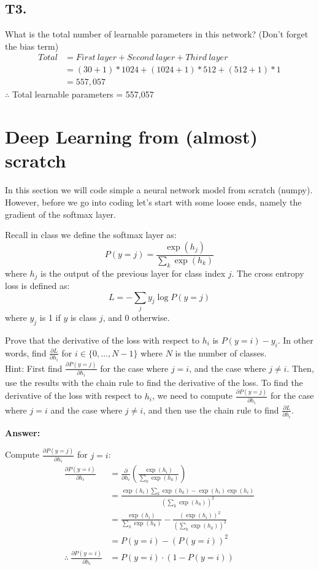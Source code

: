 \documentclass[12pt]{article}
\begin{document}
\subsection*{T3.}
\quad What is the total number of learnable parameters in this network? (Don’t forget the bias term)
\[
    \begin{split}
        Total
        &= First\ layer + Second\ layer + Third\ layer \\
        &= (30+1)*1024 + (1024+1)*512 + (512+1)*1 \\
        &= 557,057
    \end{split}
\]
$\therefore$ Total learnable parameters = 557,057

\section*{Deep Learning from (almost) scratch}
\quad In this section we will code simple a neural network model from scratch (numpy). However, before we go into coding let’s start with some loose ends, namely the gradient of the softmax layer.

Recall in class we define the softmax layer as:
\[
    P(y = j) = \frac{\exp(h_j)}{\sum_k \exp(h_k)}
\]
where $h_j$ is the output of the previous layer for class index $j$. The cross entropy loss is defined as:
\[
L = -\sum_j y_j \log P(y = j)
\]
where $y_j$ is 1 if $y$ is class $j$, and 0 otherwise.

\quad Prove that the derivative of the loss with respect to $h_i$ is $P(y = i) - y_i$. In other words, find $\frac{\partial L}{\partial h_i}$ for $i \in \{0, \ldots, N - 1\}$ where $N$ is the number of classes. \\
Hint: First find $\frac{\partial P(y=j)}{\partial h_i}$ for the case where $j = i$, and the case where $j \neq i$. Then, use the results with the chain rule to find the derivative of the loss.
To find the derivative of the loss with respect to $h_i$, we need to compute $\frac{\partial P(y=j)}{\partial h_i}$ for the case where $j=i$ and the case where $j\neq i$, and then use the chain rule to find $\frac{\partial L}{\partial h_i}$.

\textbf{Answer:}
\par
Compute $\frac{\partial P(y=j)}{\partial h_i}$ for $j=i$:
\begin{align*}
\frac{\partial P(y=i)}{\partial h_i} &= \frac{\partial}{\partial h_i} \left( \frac{\exp(h_i)}{\sum_k \exp(h_k)} \right) \\
&= \frac{\exp(h_i) \sum_k \exp(h_k) - \exp(h_i) \exp(h_i)}{(\sum_k \exp(h_k))^2} \\
&= \frac{\exp(h_i)}{\sum_k \exp(h_k)} - \frac{(\exp(h_i))^2}{(\sum_k \exp(h_k))^2} \\
&= P(y=i) - (P(y=i))^2 \\
\therefore\ \frac{\partial P(y=i)}{\partial h_i} &= P(y=i) \cdot (1 - P(y=i)) \\
\end{align*}
\end{document}
